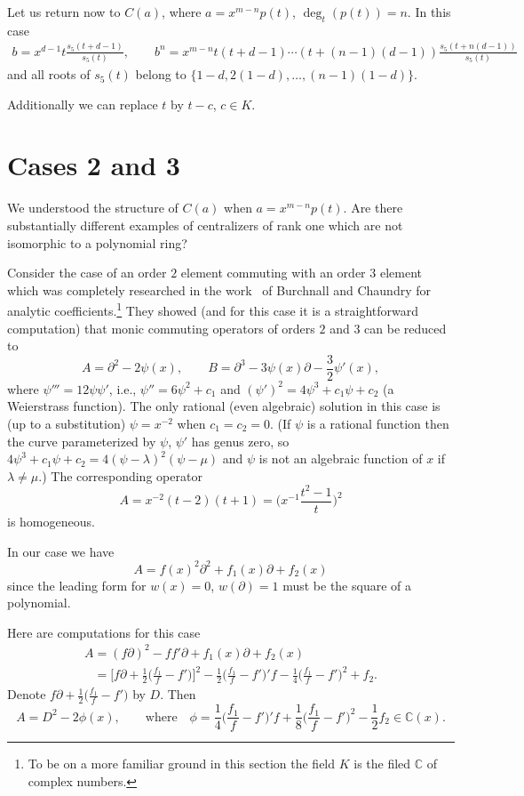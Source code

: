 \documentclass[pdftex]{sigma}
\numberwithin{equation}{section}
\newcommand{\de}{\partial}
\newcommand{\C}{\mathbb C}
\newcommand{\la}{\lambda}
\begin{document}
Let us return now to $C(a)$, where $a = x^{m-n}p(t)$, $\deg_t(p(t)) = n$. In this case
\begin{gather*}
b = x^{d-1}t\frac{s_5(t+d-1)}{s_5(t)},
\qquad
b^n = x^{m-n}t(t + d -1)\cdots(t + (n-1)(d-1))\frac{s_5(t+n(d-1))}{s_5(t)}
\end{gather*}
and all roots of $s_5(t)$ belong to $\{1 - d, 2(1 - d), \dots, (n-1)(1-d)\}$.

Additionally we can replace $t$ by $t - c$, $c \in K$.

\section{Cases 2 and 3}

We understood the structure of $C(a)$ when $a = x^{m-n}p(t)$. Are there substantially different examples of centralizers of rank one which are not isomorphic to a polynomial ring?

Consider the case of an order $2$ element commuting with an order $3$ element which was completely researched in
the work~\cite{BC1} of Burchnall and Chaundry for analytic coefficients.\footnote{To be on a more familiar ground in this section the field $K$ is the filed $\C$ of complex numbers.} They showed (and for this case it is a straightforward computation) that monic commuting operators of orders $2$ and $3$ can be reduced to
\[
A = \de^2 - 2\psi(x),\qquad
B = \de^3 - 3\psi(x)\de - \frac{3}{2}\psi'(x),
\]
where $\psi''' = 12\psi\psi'$, i.e., $\psi'' = 6\psi^2 + c_1$ and $(\psi')^2 = 4\psi^3 + c_1\psi + c_2$ (a Weierstrass function). The only rational (even algebraic) solution in this case is (up to a substitution) $\psi = x^{-2}$ when $c_1 = c_2 = 0$. (If $\psi$ is a rational function then the curve parameterized by $\psi$, $\psi'$ has genus zero, so $4\psi^3 + c_1\psi + c_2 = 4(\psi - \la)^2(\psi - \mu)$ and $\psi$ is not an algebraic function of $x$ if $\la \ne \mu$.) The corresponding operator
\[
A = x^{-2}(t-2)(t+1) = \bigg(x^{-1}\frac{t^2 - 1}{t}\bigg)^2
\]
is homogeneous.

In our case we have
\[
A = f(x)^2\de^2 + f_1(x)\de + f_2(x)
\]
since the leading form for $w(x) = 0$, $w(\de) = 1$ must be the square of a polynomial.

Here are computations for this case
\begin{gather*}
A = (f\de)^2 - ff'\de + f_1(x)\de + f_2(x)
\\ \phantom{A}
{}= \bigg[f\de + \frac{1}{2}\bigg(\frac{f_1}{f} - f'\bigg)\bigg]^2 - \frac{1}{2}\bigg(\frac{f_1}{f} - f'\bigg)'f - \frac{1}{4}\bigg(\frac{f_1}{f} - f'\bigg)^2 + f_2.
\end{gather*}
Denote $f\de + \frac{1}{2}\big(\frac{f_1}{f} - f'\big)$ by $D$. Then
\[
A = D^2 - 2\phi (x), \qquad
\text{where}\quad
\phi = \frac{1}{4}\bigg(\frac{f_1}{f} - f'\bigg)'f + \frac{1}{8}\bigg(\frac{f_1}{f} - f'\bigg)^2 - \frac{1}{2}f_2 \in \C(x).
\]
\end{document}
